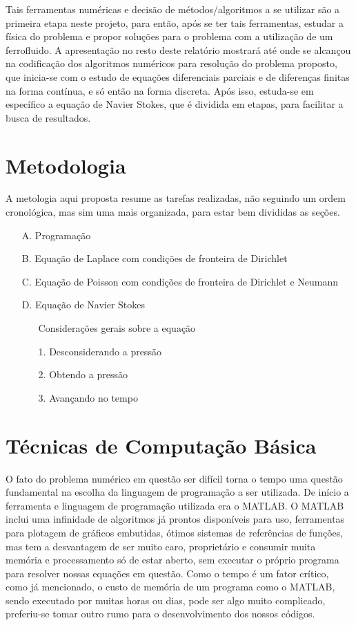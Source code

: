 \documentclass[journal]{IEEEtran}
\begin{document}
Tais ferramentas numéricas e decisão de métodos/algoritmos a se utilizar são a primeira etapa neste projeto, para então, após se ter tais ferramentas, estudar a física do problema e propor soluções para o problema com a utilização de um ferrofluido. A apresentação no resto deste relatório mostrará até onde se alcançou na codificação dos algoritmos numéricos para resolução do problema proposto, que inicia-se com o estudo de equações diferenciais parciais e de diferenças finitas na forma contínua, e só então na forma discreta. Após isso, estuda-se em específico a equação de Navier Stokes, que é dividida em etapas, para facilitar a busca de resultados.
\section{Metodologia}
A metologia aqui proposta resume as tarefas realizadas, não seguindo um ordem cronológica, mas sim uma mais organizada, para estar bem divididas as seções.
\begin{enumerate}
  \item[A.] Programação
  \item[B.] Equação de Laplace com condições de fronteira de Dirichlet
  \item[C.] Equação de Poisson com condições de fronteira de Dirichlet e Neumann
  \item[D.] Equação de Navier Stokes
  \begin{enumerate}
  \item [] Considerações gerais sobre a equação
  \item[1.] Desconsiderando a pressão
  \item[2.] Obtendo a pressão
  \item[3.] Avançando no tempo
  \end{enumerate}
\end{enumerate}
\section{Técnicas de Computação Básica}
O fato do problema numérico em questão ser difícil torna o tempo uma questão fundamental na escolha da linguagem de programação a ser utilizada. De início a ferramenta e linguagem de programação utilizada era o MATLAB\textregistered. O MATLAB inclui uma infinidade de algoritmos já prontos disponíveis para uso, ferramentas para plotagem de gráficos embutidas, ótimos sistemas de referências de funções, mas tem a desvantagem de ser muito caro, proprietário e consumir muita memória e processamento só de estar aberto, sem executar o próprio programa para resolver nossas equações em questão. Como o tempo é um fator crítico, como já mencionado, o custo de memória de um programa como o MATLAB, sendo executado por muitas horas ou dias, pode ser algo muito complicado, preferiu-se tomar outro rumo para o desenvolvimento dos nossos códigos.
\end{document}
